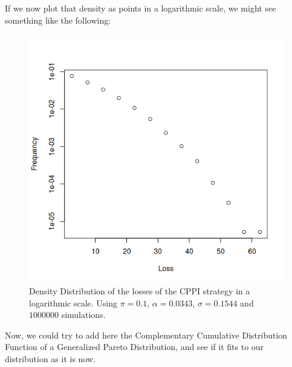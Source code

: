 If we now plot that density as points in a logarithmic scale, we might see something like the following:

\begin{figure}[H]
    \centering
    \includegraphics[scale=0.75]{images/cppi-dens-points.png}
    \caption{Density Distribution of the losses of the CPPI strategy in a logarithmic scale. Using $\pi = 0.1$, $\alpha = 0.0343$, $\sigma = 0.1544$ and $1000000$ simulations.}
    \label{fig:cppi-dens-points}
\end{figure}

Now, we could try to add here the Complementary Cumulative Distribution Function of a Generalized Pareto Distribution, and see if it fits to our distribution as it is now.


